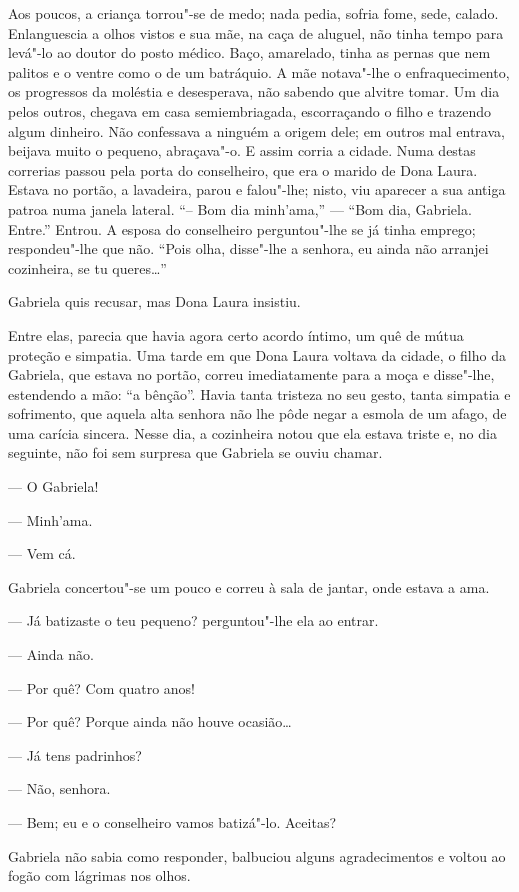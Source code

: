 Aos poucos, a criança torrou"-se de medo; nada pedia, sofria fome, sede,
calado. Enlanguescia a olhos vistos e sua mãe, na caça de aluguel, não
tinha tempo para levá"-lo ao doutor do posto médico. Baço, amarelado,
tinha as pernas que nem palitos e o ventre como o de um batráquio. A mãe
notava"-lhe o enfraquecimento, os progressos da moléstia e desesperava,
não sabendo que alvitre tomar. Um dia pelos outros, chegava em casa
semiembriagada, escorraçando o filho e trazendo algum dinheiro. Não
confessava a ninguém a origem dele; em outros mal entrava, beijava muito
o pequeno, abraçava"-o. E assim corria a cidade. Numa destas correrias
passou pela porta do conselheiro, que era o marido de Dona Laura. Estava
no portão, a lavadeira, parou e falou"-lhe; nisto, viu aparecer a sua
antiga patroa numa janela lateral. ``-- Bom dia minh'ama,'' --- ``Bom
dia, Gabriela. Entre.'' Entrou. A esposa do conselheiro perguntou"-lhe se
já tinha emprego; respondeu"-lhe que não. ``Pois olha, disse"-lhe a
senhora, eu ainda não arranjei cozinheira, se tu queres\ldots{}''

Gabriela quis recusar, mas Dona Laura insistiu.

Entre elas, parecia que havia agora certo acordo íntimo, um quê de mútua
proteção e simpatia. Uma tarde em que Dona Laura voltava da cidade, o
filho da Gabriela, que estava no portão, correu imediatamente para a
moça e disse"-lhe, estendendo a mão: ``a bênção''. Havia tanta tristeza
no seu gesto, tanta simpatia e sofrimento, que aquela alta senhora não
lhe pôde negar a esmola de um afago, de uma carícia sincera. Nesse dia,
a cozinheira notou que ela estava triste e, no dia seguinte, não foi sem
surpresa que Gabriela se ouviu chamar.

--- O Gabriela!

--- Minh'ama.

--- Vem cá.

Gabriela concertou"-se um pouco e correu à sala de jantar, onde estava a
ama.

--- Já batizaste o teu pequeno? perguntou"-lhe ela ao entrar.

--- Ainda não.

--- Por quê? Com quatro anos!

--- Por quê? Porque ainda não houve ocasião\ldots{}

--- Já tens padrinhos?

--- Não, senhora.

--- Bem; eu e o conselheiro vamos batizá"-lo. Aceitas?

Gabriela não sabia como responder, balbuciou alguns agradecimentos e
voltou ao fogão com lágrimas nos olhos.

